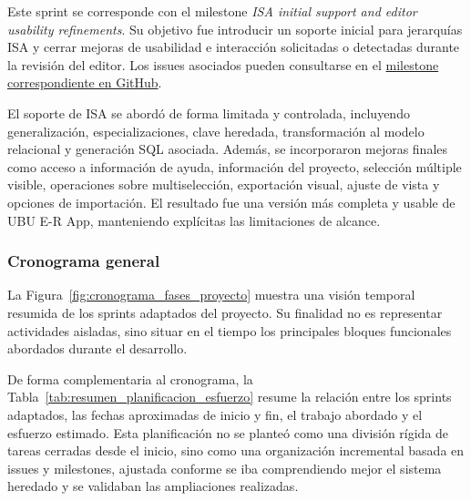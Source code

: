 Este sprint se corresponde con el milestone \textit{ISA initial support and editor usability refinements}. Su objetivo fue introducir un soporte inicial para jerarquías ISA y cerrar mejoras de usabilidad e interacción solicitadas o detectadas durante la revisión del editor. Los issues asociados pueden consultarse en el \href{https://github.com/saa1002/draw-entity-relation/milestone/5?closed=1}{milestone correspondiente en GitHub}.

El soporte de ISA se abordó de forma limitada y controlada, incluyendo generalización, especializaciones, clave heredada, transformación al modelo relacional y generación SQL asociada. Además, se incorporaron mejoras finales como acceso a información de ayuda, información del proyecto, selección múltiple visible, operaciones sobre multiselección, exportación visual, ajuste de vista y opciones de importación. El resultado fue una versión más completa y usable de UBU E-R App, manteniendo explícitas las limitaciones de alcance.


\subsubsection{Cronograma general}

La Figura~\ref{fig:cronograma_fases_proyecto} muestra una visión temporal resumida de los sprints adaptados del proyecto. Su finalidad no es representar actividades aisladas, sino situar en el tiempo los principales bloques funcionales abordados durante el desarrollo.


De forma complementaria al cronograma, la Tabla~\ref{tab:resumen_planificacion_esfuerzo} resume la relación entre los sprints adaptados, las fechas aproximadas de inicio y fin, el trabajo abordado y el esfuerzo estimado. Esta planificación no se planteó como una división rígida de tareas cerradas desde el inicio, sino como una organización incremental basada en issues y milestones, ajustada conforme se iba comprendiendo mejor el sistema heredado y se validaban las ampliaciones realizadas.

